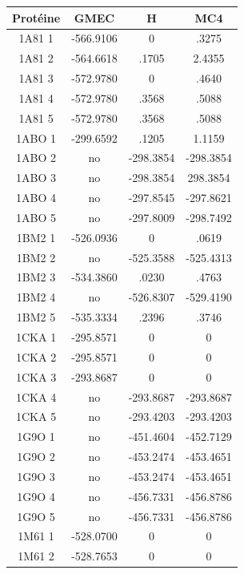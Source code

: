 \documentclass[a4paper,12pt]{article}
\begin{document}
    \begin{table}[!htbp]
      \centering

      \begin{tabular}{|c|c|c|c|}


        \hline
        Protéine & GMEC & H & MC4 \\
        \hline
        1A81 1 & -566.9106 & 0 & .3275 \\
        1A81 2 & -564.6618 & .1705 & 2.4355 \\
        1A81 3 & -572.9780 & 0 & .4640 \\
        1A81 4 & -572.9780 & .3568 & .5088 \\
        1A81 5 & -572.9780 & .3568 & .5088 \\
        1ABO 1 & -299.6592 & .1205 & 1.1159 \\
        1ABO 2 & no & -298.3854 & -298.3854 \\
        1ABO 3 & no & -298.3854 & 298.3854 \\
        1ABO 4 & no & -297.8545 & -297.8621 \\
        1ABO 5 & no & -297.8009 & -298.7492 \\
        1BM2 1 & -526.0936 & 0 & .0619 \\
        1BM2 2 & no & -525.3588 & -525.4313 \\
        1BM2 3 & -534.3860 & .0230 & .4763 \\
        1BM2 4 & no & -526.8307 & -529.4190 \\
        1BM2 5 & -535.3334 & .2396 & .3746\\
        1CKA 1 & -295.8571 & 0 & 0 \\
        1CKA 2 & -295.8571 & 0 & 0 \\
        1CKA 3 & -293.8687 & 0 & 0 \\
        1CKA 4 & no & -293.8687 & -293.8687 \\
        1CKA 5 & no & -293.4203 & -293.4203 \\
        1G9O 1 & no & -451.4604 & -452.7129 \\
        1G9O 2 & no & -453.2474 & -453.4651 \\
        1G9O 3 & no & -453.2474 & -453.4651 \\
        1G9O 4 & no & -456.7331 & -456.8786 \\
        1G9O 5 & no & -456.7331 & -456.8786 \\
        1M61 1 & -528.0700 & 0 & 0 \\
        1M61 2 & -528.7653 & 0 & 0 \\

\end{tabular}
\end{table}
\end{document}
